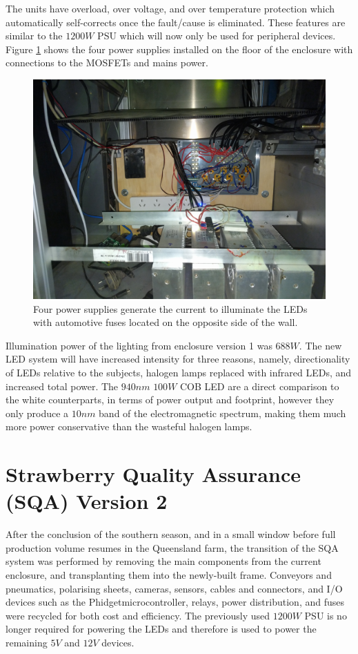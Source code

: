 \documentclass[fleqn,twoside,12pt]{report}
\begin{document}
The units have overload, over voltage, and over temperature protection which automatically self-corrects once the fault/cause is eliminated. These features are similar to the $1200W$ PSU which will now only be used for peripheral devices. Figure \ref{fig:mosfet_power_supply} shows the four power supplies installed on the floor of the enclosure with connections to the MOSFETs and mains power.

\begin{figure}[h]
	\centering
	\includegraphics[width=.5\linewidth]{mosfet_power_supply.jpg}
	\caption{Four power supplies generate the current to illuminate the LEDs with automotive fuses located on the opposite side of the wall.}
	\label{fig:mosfet_power_supply}
\end{figure}%


Illumination power of the lighting from enclosure version 1 was $688W$. The new LED system will have increased intensity for three reasons, namely, directionality of LEDs relative to the subjects, halogen lamps replaced with infrared LEDs, and increased total power. The $940nm$ $100W$ COB LED are a direct comparison to the white counterparts, in terms of power output and footprint, however they only produce a $10nm$ band of the electromagnetic spectrum, making them much more power conservative than the wasteful halogen lamps. 



\section{Strawberry Quality Assurance (SQA) Version 2}

After the conclusion of the southern season, and in a small window before full production volume resumes in the Queensland farm, the transition of the SQA system was performed by removing the main components from the current enclosure, and transplanting them into the newly-built frame. Conveyors and pneumatics, polarising sheets, cameras, sensors, cables and connectors, and I/O devices such as the Phidget\texttrademark microcontroller, relays, power distribution, and fuses were recycled for both cost and efficiency. The previously used $1200W$ PSU is no longer required for powering the LEDs and therefore is used to power the remaining $5V$ and $12V$ devices.
\end{document}
